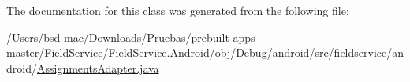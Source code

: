 The documentation for this class was generated from the following file\+:\begin{DoxyCompactItemize}
\item 
/\+Users/bsd-\/mac/\+Downloads/\+Pruebas/prebuilt-\/apps-\/master/\+Field\+Service/\+Field\+Service.\+Android/obj/\+Debug/android/src/fieldservice/android/\hyperlink{_assignments_adapter_8java}{Assignments\+Adapter.\+java}\end{DoxyCompactItemize}
